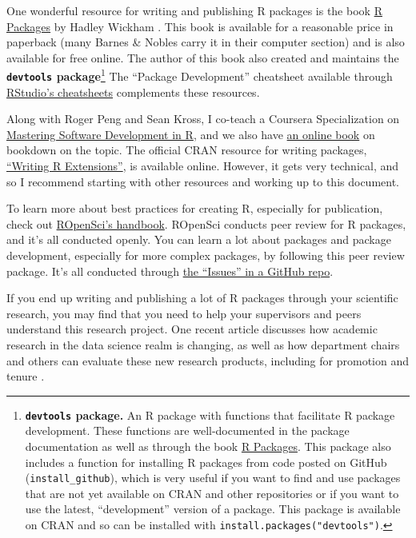 \documentclass[]{tufte-book}
\begin{document}
One wonderful resource for writing and publishing R packages is the book \href{http://r-pkgs.had.co.nz/}{R
Packages} by Hadley Wickham \citep{wickham2015r}. This book
is available for a reasonable price in paperback (many Barnes \& Nobles carry it
in their computer section) and is also available for free online. The author of
this book also created and maintains the \textbf{\texttt{devtools} package}\footnote{\textbf{\texttt{devtools}
  package.} An R package with functions that facilitate R package development.
  These functions are well-documented in the package documentation as well as
  through the book \href{http://r-pkgs.had.co.nz/}{R Packages}. This package also
  includes a function for installing R packages from code posted on GitHub
  (\texttt{install\_github}), which is very useful if you want to find and use packages
  that are not yet available on CRAN and other repositories or if you want to use
  the latest, ``development'' version of a package. This package is available on
  CRAN and so can be installed with \texttt{install.packages("devtools")}.} The ``Package
Development'' cheatsheet available through \href{https://www.rstudio.com/resources/cheatsheets/}{RStudio's
cheatsheets} complements these
resources.

Along with Roger Peng and Sean Kross, I co-teach a Coursera Specialization on
\href{https://www.coursera.org/specializations/r}{Mastering Software Development in
R}, and we also have \href{https://bookdown.org/rdpeng/RProgDA/}{an online
book} on bookdown on the topic. The
official CRAN resource for writing packages, \href{https://cran.r-project.org/doc/manuals/r-release/R-exts.html}{``Writing R
Extensions''}, is
available online. However, it gets very technical, and so I recommend starting
with other resources and working up to this document.

To learn more about best practices for creating R, especially for publication,
check out \href{https://ropensci.github.io/dev_guide/}{ROpenSci's handbook}. ROpenSci
conducts peer review for R packages, and it's all conducted openly. You can
learn a lot about packages and package development, especially for more complex
packages, by following this peer review package. It's all conducted through \href{https://github.com/ropensci/software-review/issues}{the
``Issues'' in a GitHub repo}.

If you end up writing and publishing a lot of R packages through your scientific
research, you may find that you need to help your supervisors and peers
understand this research project. One recent article discusses how academic
research in the data science realm is changing, as well as how department chairs
and others can evaluate these new research products, including for promotion and
tenure \citep{waller2018documenting}.
\end{document}
